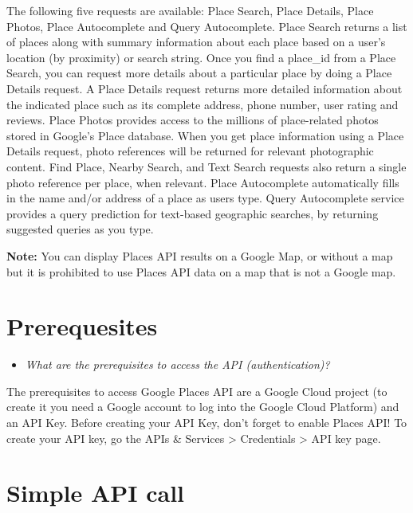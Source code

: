 \documentclass[
]{book}
\providecommand{\tightlist}{%
  \setlength{\itemsep}{0pt}\setlength{\parskip}{0pt}}
\begin{document}
The following five requests are available: Place Search, Place Details, Place Photos, Place Autocomplete and Query Autocomplete. Place Search returns a list of places along with summary information about each place based on a user's location (by proximity) or search string. Once you find a place\_id from a Place Search, you can request more details about a particular place by doing a Place Details request. A Place Details request returns more detailed information about the indicated place such as its complete address, phone number, user rating and reviews. Place Photos provides access to the millions of place-related photos stored in Google's Place database. When you get place information using a Place Details request, photo references will be returned for relevant photographic content. Find Place, Nearby Search, and Text Search requests also return a single photo reference per place, when relevant. Place Autocomplete automatically fills in the name and/or address of a place as users type. Query Autocomplete service provides a query prediction for text-based geographic searches, by returning suggested queries as you type.

\textbf{Note:} You can display Places API results on a Google Map, or without a map but it is prohibited to use Places API data on a map that is not a Google map.

\hypertarget{prerequesites-3}{%
\section{Prerequesites}\label{prerequesites-3}}

\begin{itemize}
\tightlist
\item
  \emph{What are the prerequisites to access the API (authentication)? }
\end{itemize}

The prerequisites to access Google Places API are a Google Cloud project (to create it you need a Google account to log into the Google Cloud Platform) and an API Key. Before creating your API Key, don't forget to enable Places API! To create your API key, go the APIs \& Services \textgreater{} Credentials \textgreater{} API key page.

\hypertarget{simple-api-call-3}{%
\section{Simple API call}\label{simple-api-call-3}}
\end{document}
